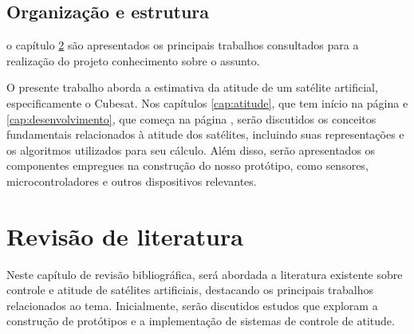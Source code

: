 \documentclass[
	12pt,				%
	openright,			%
	oneside,			%
	a4paper,			%
	english,			%
	brazil				%
	]{abntex2}
\begin{document}
\section{Organização e estrutura}



o capítulo \ref{cap:revisao-de-literatura} são apresentados os principais trabalhos consultados para a realização do projeto conhecimento sobre o assunto.

O presente trabalho aborda a estimativa da atitude de um satélite artificial, especificamente o Cubesat. Nos capítulos \ref{cap:atitude}, que tem início na página \pageref{cap:atitude} e  \ref{cap:desenvolvimento}, que começa na página \pageref{cap:desenvolvimento}, serão discutidos os conceitos fundamentais relacionados à atitude dos satélites, incluindo suas representações e os algoritmos utilizados para seu cálculo. Além disso, serão apresentados os componentes empregues na construção do nosso protótipo, como sensores, microcontroladores e outros dispositivos relevantes.


\chapter{Revisão de literatura} \label{cap:revisao-de-literatura}

Neste capítulo de revisão bibliográfica, será abordada a literatura existente sobre controle e atitude de satélites artificiais, destacando os principais trabalhos relacionados ao tema. Inicialmente, serão discutidos estudos que exploram a construção de protótipos e a implementação de sistemas de controle de atitude.
\end{document}
